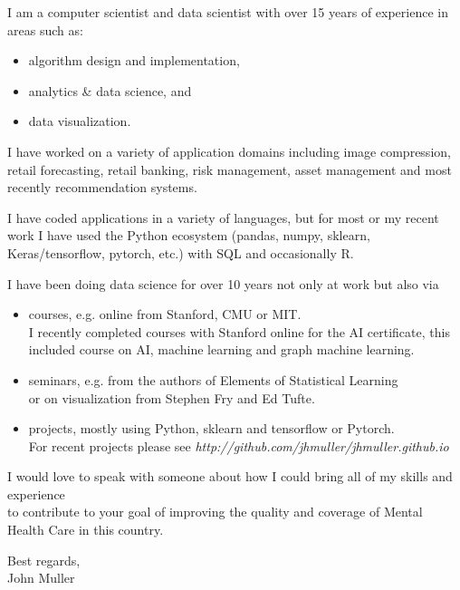 \documentclass{article}
\begin{document}
\noindent
I am a computer scientist and data scientist with over 15 years of experience in areas such as:
\begin{itemize}[noitemsep]
 \item algorithm design and implementation,
 \item analytics \& data science, and
 \item data visualization.
\end{itemize}

I have worked on a variety of application domains including image compression, retail forecasting, retail banking, risk management, asset management and most recently recommendation systems.

I have coded applications in a variety of languages, but for most or my recent work I have used the Python ecosystem (pandas, numpy, sklearn, Keras/tensorflow, pytorch, etc.)  with SQL and occasionally R.
\vspace{0.1in}

I have been doing data science for over 10 years not only at work but also via 
\begin{itemize}
 \item courses, e.g. online from Stanford, CMU or MIT.\\
 I recently completed courses with Stanford online for the AI certificate, this included course on AI, machine learning and graph machine learning.
 
 \item seminars, e.g. from the authors of Elements of  Statistical Learning \\
     \hspace*{.4in}  \>   or on visualization from Stephen Fry and Ed Tufte.
  \item projects, mostly using Python, sklearn and tensorflow or Pytorch. \\
    \hspace*{0.2in} For recent projects please see {\em {http://github.com/jhmuller/jhmuller.github.io}}
\end{itemize}



\noindent I would love to speak with someone about how I could bring all of my skills and experience \\
to contribute to your goal of improving the quality and coverage of Mental Health Care in this country.

\vspace*{0.2in}
Best regards,\\
John Muller
\end{document}
